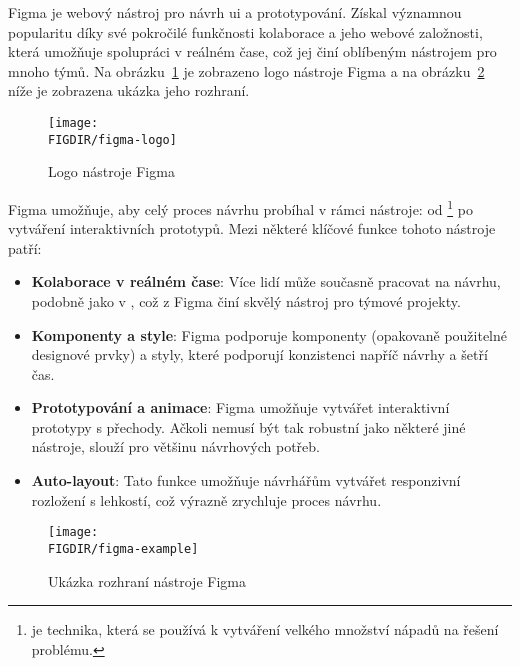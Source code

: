\begin{subsection}{Figma}
    \label{subsec:navrh-ui-nastroje-figma}
     je webový nástroj pro návrh \ac{ui} a prototypování.
    Získal významnou popularitu díky své pokročilé funkčnosti kolaborace a jeho webové založnosti, která umožňuje spolupráci v reálném čase, což jej činí oblíbeným nástrojem pro mnoho týmů\cite{w_industry_the_ultimate_battle_figma_vs_sketch_vs_adobe_xd}.
    Na obrázku~\ref{fig:figma-logo} je zobrazeno logo nástroje Figma a na obrázku~\ref{fig:figma-example} níže je zobrazena ukázka jeho rozhraní.

    \begin{figure}[H]
        \centering
        \texttt{[image: \\FIGDIR/figma-logo]}
        \caption{Logo nástroje Figma\cite{figma}}
        \label{fig:figma-logo}
    \end{figure}

    Figma umožňuje, aby celý proces návrhu probíhal v rámci nástroje: od \footnote{ je technika, která se používá k vytváření velkého množství nápadů na řešení problému.} po vytváření interaktivních prototypů.
    Mezi některé klíčové funkce tohoto nástroje patří:

    \begin{itemize}
        \item \textbf{Kolaborace v reálném čase}: Více lidí může současně pracovat na návrhu, podobně jako v , což z Figma činí skvělý nástroj pro týmové projekty.
        \item \textbf{Komponenty a style}: Figma podporuje komponenty (opakovaně použitelné designové prvky) a styly, které podporují konzistenci napříč návrhy a šetří čas.
        \item \textbf{Prototypování a animace}: Figma umožňuje vytvářet interaktivní prototypy s přechody.
        Ačkoli nemusí být tak robustní jako některé jiné nástroje, slouží pro většinu návrhových potřeb.
        \item \textbf{Auto-layout}: Tato funkce umožňuje návrhářům vytvářet responzivní rozložení s lehkostí, což výrazně zrychluje proces návrhu.
    \end{itemize}

    \begin{figure}[H]
        \centering
        \texttt{[image: \\FIGDIR/figma-example]}
        \caption{Ukázka rozhraní nástroje Figma\cite{figma}}
        \label{fig:figma-example}
    \end{figure}


\end{subsection}
